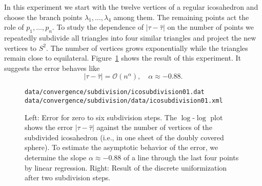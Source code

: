 \documentclass[Thesis]{subfiles}
\begin{document}



In this experiment we start with the twelve vertices of a regular
icosahedron and choose the branch points $\lambda_1,\ldots,\lambda_4$
among them. The remaining points act the role of $p_1,\ldots,p_n$. To study
the dependence of $|\tau-\hat \tau|$ on the number of points we
repeatedly subdivide all triangles into four similar triangles
and project the new vertices to $S^2$. The number of vertices
grows exponentially while the triangles remain close to equilateral.
Figure~\ref{fig:convergence_subdivision} shows the result of this
experiment. It suggests the error behaves like
\begin{equation}
\label{eq:error_ico}
|\tau-\hat \tau|=\mathcal O (n^\alpha),\quad\alpha \approx -0.88.
\end{equation}


\begin{figure}
\centering
{}
{\scriptsize\tt data/convergence/subdivision/icosubdivision01.dat}\\
{\scriptsize\tt data/convergence/subdivision/data/icosubdivision01.xml}
\caption{Left: Error for zero to six subdivision steps. The
  $\log$-$\log$ plot shows the error $|\tau - \hat\tau|$ against the
  number of vertices of the subdivided icosahedron (i.e., in one sheet
  of the doubly covered sphere). To estimate the asymptotic behavior
  of the error, we determine the slope $\alpha\approx-0.88$ of a line
  through the last four points by linear regression. Right: Result of
  the discrete uniformization after two subdivision steps.}
\label{fig:convergence_subdivision}
\end{figure}
\end{document}

